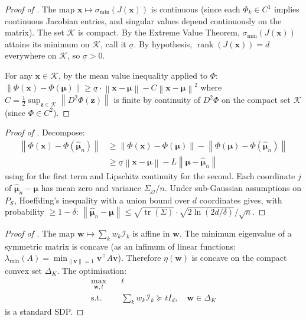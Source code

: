 \documentclass{article}
\newcommand{\Nset}{\mathcal{S}}  %
\newcommand{\norm}[1]{\left\lVert#1\right\rVert}
\DeclareMathOperator{\tr}{tr}
\DeclareMathOperator{\rank}{rank}
\begin{document}
\begin{proof}[Proof of ]
The map $\mathbf{x} \mapsto \sigma_{\min}(J(\mathbf{x}))$ is continuous (since each $\Phi_k \in C^1$ implies continuous Jacobian entries, and singular values depend continuously on the matrix). The set $\mathcal{K}$ is compact. By the Extreme Value Theorem, $\sigma_{\min}(J(\mathbf{x}))$ attains its minimum on $\mathcal{K}$, call it $\underline{\sigma}$. By hypothesis, $\rank(J(\mathbf{x})) = d$ everywhere on $\mathcal{K}$, so $\underline{\sigma} > 0$.

For any $\mathbf{x} \in \mathcal{K}$, by the mean value inequality applied to $\Phi$:
$\norm{\Phi(\mathbf{x}) - \Phi(\bm{\mu})} \geq \underline{\sigma} \cdot \norm{\mathbf{x} - \bm{\mu}} - C\norm{\mathbf{x}-\bm{\mu}}^2$
where $C = \frac{1}{2}\sup_{\mathbf{z} \in \mathcal{K}} \norm{D^2\Phi(\mathbf{z})}$ is finite by continuity of $D^2\Phi$ on the compact set $\mathcal{K}$ (since $\Phi \in C^2$).
\end{proof}

\begin{proof}[Proof of ]
Decompose:
\begin{align*}
\norm{\Phi(\mathbf{x}) - \Phi(\hat{\bm{\mu}}_n)} &\geq \norm{\Phi(\mathbf{x}) - \Phi(\bm{\mu})} - \norm{\Phi(\bm{\mu}) - \Phi(\hat{\bm{\mu}}_n)} \\
&\geq \underline{\sigma}\norm{\mathbf{x}-\bm{\mu}} - L\norm{\bm{\mu} - \hat{\bm{\mu}}_n}
\end{align*}
using  for the first term and Lipschitz continuity for the second. Each coordinate $j$ of $\hat{\bm{\mu}}_n - \bm{\mu}$ has mean zero and variance $\Sigma_{jj}/n$. Under sub-Gaussian assumptions on $P_\Nset$, Hoeffding's inequality with a union bound over $d$ coordinates gives, with probability $\geq 1 - \delta$:
$\norm{\hat{\bm{\mu}}_n - \bm{\mu}} \leq \sqrt{\tr(\Sigma)} \cdot \sqrt{2\ln(2d/\delta)} / \sqrt{n}$.
\end{proof}

\begin{proof}[Proof of ]
The map $\mathbf{w} \mapsto \sum_k w_k \mathcal{I}_k$ is affine in $\mathbf{w}$. The minimum eigenvalue of a symmetric matrix is concave (as an infimum of linear functions: $\lambda_{\min}(A) = \min_{\norm{\mathbf{v}}=1} \mathbf{v}^\top A\mathbf{v}$). Therefore $\eta(\mathbf{w})$ is concave on the compact convex set $\Delta_K$. The optimisation:
\begin{align*}
\max_{\mathbf{w}, t} \quad & t \\
\text{s.t.} \quad & \textstyle\sum_k w_k \mathcal{I}_k \succeq t I_d, \quad \mathbf{w} \in \Delta_K
\end{align*}
is a standard SDP.
\end{proof}
\end{document}
